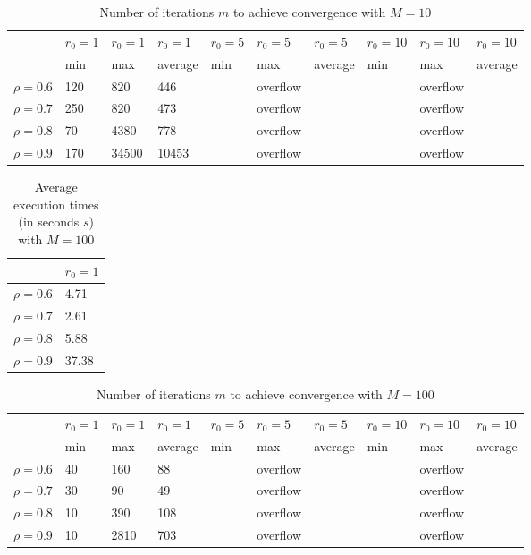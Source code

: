 \documentclass[a4paper,11pt,openright]{report}
\begin{document}
\begin{table}[H]
\centering
\addtolength{\leftskip}{-1.5cm}
\addtolength{\rightskip}{-1.5cm}
\begin{tabular}{|c|lllllllll|}
\hline
$ $ & $r_0 = 1$ & $r_0 = 1$ & $r_0 = 1$ & $r_0 = 5$ & $r_0 = 5$ & $r_0 = 5$ & $r_0 = 10$ & $r_0 = 10$ & $r_0 = 10$  \\
$ $ & min & max & average & min & max & average & min & max & average \\ 
\hline
$\rho = 0.6$ & 120 & 820 & 446 &  & overflow & &  & overflow &  \\

$\rho = 0.7$ & 250 & 820 & 473 &  & overflow & &  & overflow &  \\

$\rho = 0.8$ & 70 & 4380 & 778 &  & overflow & &  & overflow &  \\

$\rho = 0.9$ & 170 & 34500 & 10453 &  & overflow & &  & overflow &  \\
\hline
\end{tabular}
\caption{Number of iterations $m$ to achieve convergence with $M = 10$}
\end{table}
\begin{table}[H]
\centering
\addtolength{\leftskip}{-1.5cm}
\addtolength{\rightskip}{-1.5cm}
\begin{tabular}{|c|l|}
\hline
$ $ & $r_0 = 1$  \\
\hline
$\rho = 0.6$ & 4.71  \\

$\rho = 0.7$ & 2.61 \\

$\rho = 0.8$ & 5.88 \\

$\rho = 0.9$ & 37.38  \\
\hline
\end{tabular}
\caption{Average execution
 times (in seconds $s$) with $M = 100$}
\end{table}
\begin{table}[H]
\centering
\addtolength{\leftskip}{-1.5cm}
\addtolength{\rightskip}{-1.5cm}
\begin{tabular}{|c|lllllllll|}
\hline
$ $ & $r_0 = 1$ & $r_0 = 1$ & $r_0 = 1$ & $r_0 = 5$ & $r_0 = 5$ & $r_0 = 5$ & $r_0 = 10$ & $r_0 = 10$ & $r_0 = 10$  \\
$ $ & min & max & average & min & max & average & min & max & average \\ 
\hline
$\rho = 0.6$ & 40 & 160 & 88 &  & overflow & &  & overflow &  \\

$\rho = 0.7$ & 30 & 90 & 49 &  & overflow & &  & overflow &  \\

$\rho = 0.8$ & 10 & 390 & 108 &  & overflow & &  & overflow &  \\

$\rho = 0.9$ & 10 & 2810 & 703 &  & overflow & &  & overflow &  \\
\hline
\end{tabular}
\caption{Number of iterations $m$ to achieve convergence with $M = 100$}
\end{table}
\end{document}
